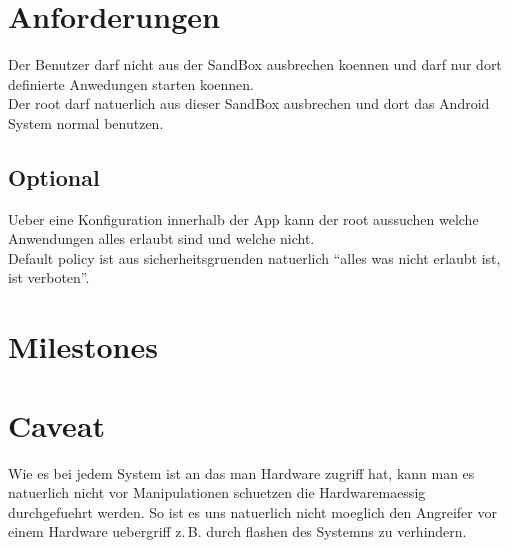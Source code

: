 \documentclass[12pt,a4paper,ngerman]{scrartcl}
\begin{document}
\section*{Anforderungen}
Der Benutzer darf nicht aus der SandBox ausbrechen koennen und darf nur dort definierte Anwedungen starten koennen. \\
Der root darf natuerlich aus dieser SandBox ausbrechen und dort das Android System normal benutzen.

\subsection*{Optional}
Ueber eine Konfiguration innerhalb der App kann der root aussuchen welche Anwendungen alles erlaubt sind und welche nicht. \\
Default policy ist aus sicherheitsgruenden natuerlich ``alles was nicht erlaubt ist, ist verboten''.

\section*{Milestones}


\section*{Caveat}
Wie es bei jedem System ist an das man Hardware zugriff hat, kann man es natuerlich nicht vor Manipulationen schuetzen die Hardwaremaessig durchgefuehrt werden. So ist es uns natuerlich nicht moeglich den Angreifer vor einem Hardware uebergriff z.\,B. durch flashen des Systemns zu verhindern.
\end{document}
